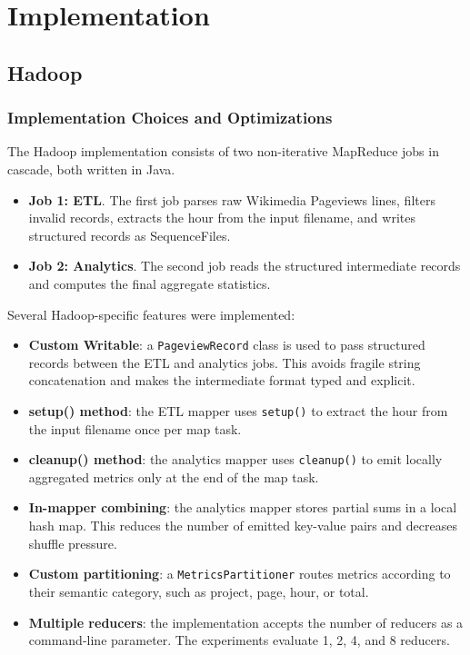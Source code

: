 \documentclass[12pt,a4paper]{report}
\begin{document}
\chapter{Implementation}

\section{Hadoop}

\subsection{Implementation Choices and Optimizations}

The Hadoop implementation consists of two non-iterative MapReduce jobs in cascade, both written in Java.

\begin{itemize}
    \item \textbf{Job 1: ETL}. The first job parses raw Wikimedia Pageviews lines, filters invalid records, extracts the hour from the input filename, and writes structured records as SequenceFiles.
    \item \textbf{Job 2: Analytics}. The second job reads the structured intermediate records and computes the final aggregate statistics.
\end{itemize}

Several Hadoop-specific features were implemented:

\begin{itemize}
    \item \textbf{Custom Writable}: a \texttt{PageviewRecord} class is used to pass structured records between the ETL and analytics jobs. This avoids fragile string concatenation and makes the intermediate format typed and explicit.
    \item \textbf{setup() method}: the ETL mapper uses \texttt{setup()} to extract the hour from the input filename once per map task.
    \item \textbf{cleanup() method}: the analytics mapper uses \texttt{cleanup()} to emit locally aggregated metrics only at the end of the map task.
    \item \textbf{In-mapper combining}: the analytics mapper stores partial sums in a local hash map. This reduces the number of emitted key-value pairs and decreases shuffle pressure.
    \item \textbf{Custom partitioning}: a \texttt{MetricsPartitioner} routes metrics according to their semantic category, such as project, page, hour, or total.
    \item \textbf{Multiple reducers}: the implementation accepts the number of reducers as a command-line parameter. The experiments evaluate 1, 2, 4, and 8 reducers.
\end{itemize}
\end{document}

